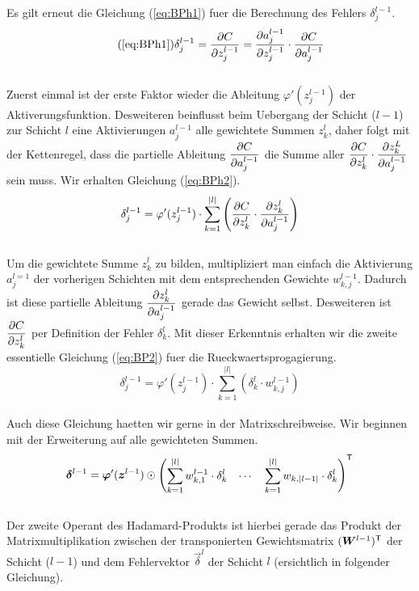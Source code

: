 Es gilt erneut die Gleichung (\ref{eq:BPh1}) fuer die Berechnung des Fehlers $\delta_j^{l-1}$.
\\
\begin{equation}\tag{\ref{eq:BPh1}}
  \delta_j^{l-1} = \partderiv{C}{z_j^{l-1}} = \partderiv{a_j^{l-1}}{z_j^{l-1}} \cdot \partderiv{C}{a_j^{l-1}}
\end{equation}
\\
Zuerst einmal ist der erste Faktor wieder die Ableitung $\varphi'(z_j^{l-1})$ der Aktiverungsfunktion.
Desweiteren beinflusst beim Uebergang der Schicht ($l-1$) zur Schicht $l$ eine Aktivierungen
$a_j^{l-1}$ alle gewichtete Summen $z_k^l$, daher folgt mit der Kettenregel,
dass die partielle Ableitung $\displaystyle\frac{\partial C}{\partial a_j^{l-1}}$ die Summe aller
$\displaystyle\frac{\partial C}{\partial z_k^l} \cdot \displaystyle\frac{\partial z_k^L}{\partial a_j^{l-1}}$ sein muss. Wir
erhalten Gleichung (\ref{eq:BPh2}).
\\
\begin{equation}\label{eq:BPh2}
  \delta_j^{l-1} = \varphi'(z_j^{l-1}) \cdot \sum_{k=1}^{|l|} \left( \frac{\partial C}{\partial z_k^l} \cdot \frac{\partial z_k^l}{\partial a_j^{l-1}} \right)
\end{equation}
\\
Um die gewichtete Summe $z_k^l$ zu bilden, multipliziert man einfach die
Aktivierung $a_j^{l=1}$ der vorherigen Schichten mit dem entsprechenden Gewichte $w_{k,j}^{l-1}$.
Dadurch ist diese partielle Ableitung $\displaystyle\frac{\partial z_k^l}{\partial a_j^{l-1}}$ gerade das
Gewicht selbst. Desweiteren ist $\displaystyle\frac{\partial C}{\partial z_k^l}$ per Definition der
Fehler $\delta_k^l$. Mit dieser Erkenntnis erhalten wir die zweite essentielle
Gleichung (\ref{eq:BP2}) fuer die Rueckwaertsprogagierung.
\\
\begin{equation}\tag{BP2}\label{eq:BP2}
  \delta_j^{l-1} = \varphi'(z_j^{l-1}) \cdot \sum_{k=1}^{|l|} \left( \delta_k^l \cdot w_{k,j}^{l-1} \right)
\end{equation}
\\
Auch diese Gleichung haetten wir gerne in der Matrixschreibweise. Wir beginnen
mit der Erweiterung auf alle gewichteten Summen.
\\
\begin{equation*}
  \bm{\delta}^{l-1} = \bm{\varphi}'(\bm{z}^{l-1}) \odot \begin{pmatrix} \displaystyle\sum_{k=1}^{|l|} w_{k,1}^{l-1} \cdot \delta_k^l & \cdots & \displaystyle\sum_{k=1}^{|l|} w_{k,|l-1|} \cdot \delta_k^l \end{pmatrix}^{\mathsf{T}}
\end{equation*}
\\
Der zweite Operant des Hadamard-Produkts ist hierbei gerade das Produkt der
Matrixmultiplikation zwischen
der transponierten Gewichtsmatrix $(\bm{W}^{l-1})^{\mathsf{T}}$ der Schicht ($l-1$)
und dem Fehlervektor $\vec{\delta}^l$ der Schicht $l$ (ersichtlich in folgender Gleichung).


